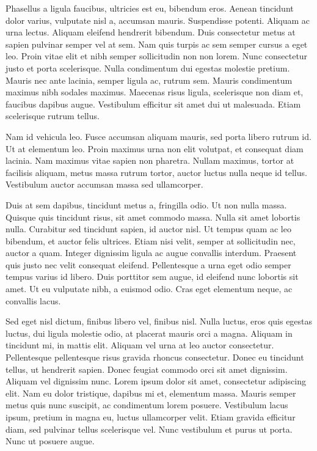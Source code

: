 \documentclass{article}
\begin{document}
Phasellus a ligula faucibus, ultricies est eu, bibendum eros. Aenean tincidunt dolor varius, vulputate nisl a, accumsan mauris. Suspendisse potenti. Aliquam ac urna lectus. Aliquam eleifend hendrerit bibendum. Duis consectetur metus at sapien pulvinar semper vel at sem. Nam quis turpis ac sem semper cursus a eget leo. Proin vitae elit et nibh semper sollicitudin non non lorem. Nunc consectetur justo et porta scelerisque. Nulla condimentum dui egestas molestie pretium. Mauris nec ante lacinia, semper ligula ac, rutrum sem. Mauris condimentum maximus nibh sodales maximus. Maecenas risus ligula, scelerisque non diam et, faucibus dapibus augue. Vestibulum efficitur sit amet dui ut malesuada. Etiam scelerisque rutrum tellus.

Nam id vehicula leo. Fusce accumsan aliquam mauris, sed porta libero rutrum id. Ut at elementum leo. Proin maximus urna non elit volutpat, et consequat diam lacinia. Nam maximus vitae sapien non pharetra. Nullam maximus, tortor at facilisis aliquam, metus massa rutrum tortor, auctor luctus nulla neque id tellus. Vestibulum auctor accumsan massa sed ullamcorper.

Duis at sem dapibus, tincidunt metus a, fringilla odio. Ut non nulla massa. Quisque quis tincidunt risus, sit amet commodo massa. Nulla sit amet lobortis nulla. Curabitur sed tincidunt sapien, id auctor nisl. Ut tempus quam ac leo bibendum, et auctor felis ultrices. Etiam nisi velit, semper at sollicitudin nec, auctor a quam. Integer dignissim ligula ac augue convallis interdum. Praesent quis justo nec velit consequat eleifend. Pellentesque a urna eget odio semper tempus varius id libero. Duis porttitor sem augue, id eleifend nunc lobortis sit amet. Ut eu vulputate nibh, a euismod odio. Cras eget elementum neque, ac convallis lacus.

Sed eget nisl dictum, finibus libero vel, finibus nisl. Nulla luctus, eros quis egestas luctus, dui ligula molestie odio, at placerat mauris orci a magna. Aliquam in tincidunt mi, in mattis elit. Aliquam vel urna at leo auctor consectetur. Pellentesque pellentesque risus gravida rhoncus consectetur. Donec eu tincidunt tellus, ut hendrerit sapien. Donec feugiat commodo orci sit amet dignissim. Aliquam vel dignissim nunc. Lorem ipsum dolor sit amet, consectetur adipiscing elit. Nam eu dolor tristique, dapibus mi et, elementum massa. Mauris semper metus quis nunc suscipit, ac condimentum lorem posuere. Vestibulum lacus ipsum, pretium in magna eu, luctus ullamcorper velit. Etiam gravida efficitur diam, sed pulvinar tellus scelerisque vel. Nunc vestibulum et purus ut porta. Nunc ut posuere augue.
\end{document}
